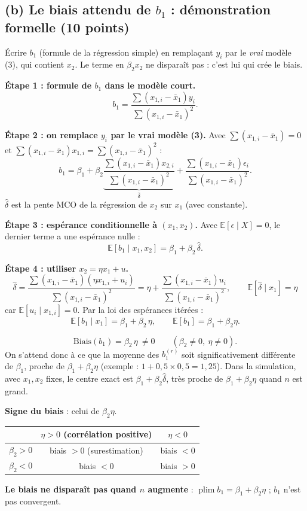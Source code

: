 \documentclass[11pt,a4paper]{article}
\newcommand{\E}{\mathbb{E}}\newcommand{\Var}{\operatorname{Var}}\newcommand{\Cov}{\operatorname{Cov}}
\newcommand{\plim}{\operatorname{plim}}
\begin{document}
\subsection*{(b) Le biais attendu de $b_1$ : démonstration formelle (10 points)}

\begin{idee}
Écrire $b_1$ (formule de la régression simple) en remplaçant $y_i$ par le \emph{vrai} modèle (3), qui contient $x_2$. Le terme en $\beta_2x_2$ ne disparaît pas : c'est lui qui crée le biais.
\end{idee}

\textbf{Étape 1 : formule de $b_1$ dans le modèle court.}
\[
b_1=\frac{\sum(x_{1,i}-\bar x_1)y_i}{\sum(x_{1,i}-\bar x_1)^2}.
\]

\textbf{Étape 2 : on remplace $y_i$ par le vrai modèle (3).} Avec $\sum(x_{1,i}-\bar x_1)=0$ et $\sum(x_{1,i}-\bar x_1)x_{1,i}=\sum(x_{1,i}-\bar x_1)^2$ :
\[
b_1=\beta_1+\beta_2\underbrace{\frac{\sum(x_{1,i}-\bar x_1)x_{2,i}}{\sum(x_{1,i}-\bar x_1)^2}}_{\hat\delta}+\frac{\sum(x_{1,i}-\bar x_1)\epsilon_i}{\sum(x_{1,i}-\bar x_1)^2}.
\]
$\hat\delta$ est la pente MCO de la régression de $x_2$ sur $x_1$ (avec constante).

\textbf{Étape 3 : espérance conditionnelle à $(x_1,x_2)$.} Avec $\E[\epsilon\mid X]=0$, le dernier terme a une espérance nulle :
\[
\E[b_1\mid x_1,x_2]=\beta_1+\beta_2\,\hat\delta .
\]

\textbf{Étape 4 : utiliser $x_2=\eta x_1+u$.}
\[
\hat\delta=\frac{\sum(x_{1,i}-\bar x_1)(\eta x_{1,i}+u_i)}{\sum(x_{1,i}-\bar x_1)^2}=\eta+\frac{\sum(x_{1,i}-\bar x_1)u_i}{\sum(x_{1,i}-\bar x_1)^2},
\qquad \E[\hat\delta\mid x_1]=\eta
\]
car $\E[u_i\mid x_{1,i}]=0$. Par la loi des espérances itérées :
\[
\E[b_1\mid x_1]=\beta_1+\beta_2\,\eta,\qquad \E[b_1]=\beta_1+\beta_2\eta .
\]

\begin{reponse}
\[
\text{Biais}(b_1)=\beta_2\,\eta\ \neq0\qquad(\beta_2\neq0,\ \eta\neq0).
\]
On s'attend donc à ce que la moyenne des $b_1^{(r)}$ soit significativement différente de $\beta_1$, proche de $\beta_1+\beta_2\eta$ (exemple : $1+0{,}5\times0{,}5=1{,}25$). Dans la simulation, avec $x_1,x_2$ fixes, le centre exact est $\beta_1+\beta_2\hat\delta$, très proche de $\beta_1+\beta_2\eta$ quand $n$ est grand.

\textbf{Signe du biais} : celui de $\beta_2\eta$.
\begin{center}
\begin{tabular}{@{}lcc@{}}
\toprule
& $\eta>0$ (corrélation positive) & $\eta<0$ \\
\midrule
$\beta_2>0$ & biais $>0$ (surestimation) & biais $<0$ \\
$\beta_2<0$ & biais $<0$ & biais $>0$ \\
\bottomrule
\end{tabular}
\end{center}
\textbf{Le biais ne disparaît pas quand $n$ augmente} : $\plim b_1=\beta_1+\beta_2\eta$ ; $b_1$ n'est pas convergent.
\end{reponse}
\end{document}
